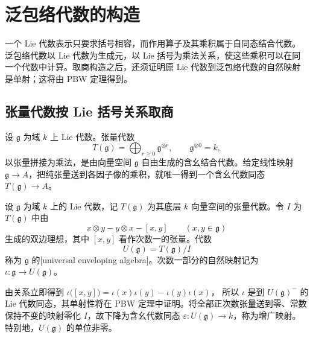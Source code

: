 
\section{泛包络代数的构造}
\label{b5:sec:1501}


%
%

一个 Lie 代数表示只要求括号相容，而作用算子及其乘积属于自同态结合代数。泛包络代数以 Lie 代数为生成元，以 Lie 括号为乘法关系，使这些乘积可以在同一个代数中计算。取商构造之后，还须证明原 Lie 代数到泛包络代数的自然映射是单射；这将由 PBW 定理得到。

\subsection{张量代数按 Lie 括号关系取商}
\label{b5:subsec:1501:01}

设 \(\mathfrak g\) 为域 \(k\) 上 Lie 代数。张量代数
\[
	T(\mathfrak g)=\bigoplus_{r\ge0}\mathfrak g^{\otimes r}, \qquad \mathfrak g^{\otimes0}=k,
\]
以张量拼接为乘法，是由向量空间 \(\mathfrak g\) 自由生成的含幺结合代数。给定线性映射 \(\mathfrak g\to A\)，把纯张量送到各因子像的乘积，就唯一得到一个含幺代数同态 \(T(\mathfrak g)\to A\)。
\begin{definition}\label{b5:def:universal-enveloping}
	设 \(\mathfrak g\) 为域 \(k\) 上的 Lie 代数，记 \(T(\mathfrak g)\) 为其底层 \(k\) 向量空间的张量代数。令 \(I\) 为 \(T(\mathfrak g)\) 中由
	\[
		x\otimes y-y\otimes x-[x,y]\qquad(x,y\in\mathfrak g)
	\]
	生成的双边理想，其中 \([x,y]\) 看作次数一的张量。代数
	\[
		U(\mathfrak g)=T(\mathfrak g)/I
	\]
	称为 \(\mathfrak g\) 的[universal enveloping algebra]。次数一部分的自然映射记为 \(\iota:\mathfrak g\to U(\mathfrak g)\)。
\end{definition}
由关系立即得到 \(\iota\bigl([x,y]\bigr)=\iota(x)\iota(y)-\iota(y)\iota(x)\)， 所以 \(\iota\) 是到 \(U(\mathfrak g)^{-}\) 的 Lie 代数同态，其单射性将在 PBW 定理中证明。将全部正次数张量送到零、常数保持不变的映射零化 \(I\)，故下降为含幺代数同态 \(\varepsilon:U(\mathfrak g)\to k\)，称为增广映射。特别地，\(U(\mathfrak g)\) 的单位非零。

\ProseParagraphBreak

